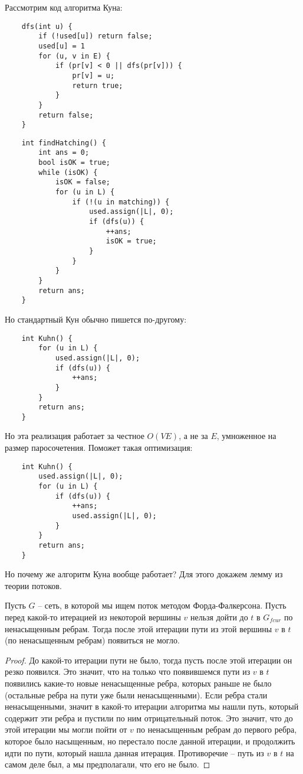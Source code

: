 \noindent Рассмотрим код алгоритма Куна:
\begin{lstlisting}
    dfs(int u) {
        if (!used[u]) return false;
        used[u] = 1
        for (u, v in E) {
            if (pr[v] < 0 || dfs(pr[v])) {
                pr[v] = u;
                return true;
            }
        }
        return false;
    }
\end{lstlisting}

\begin{lstlisting}
    int findHatching() {
        int ans = 0;
        bool isOK = true;
        while (isOK) {
            isOK = false;
            for (u in L) {
                if (!(u in matching)) {
                    used.assign(|L|, 0);
                    if (dfs(u)) {
                        ++ans;
                        isOK = true;
                    }
                }
            }
        }
        return ans;
    }
\end{lstlisting}

\noindent Но стандартный Кун обычно пишется по-другому:
\begin{lstlisting}
    int Kuhn() {
        for (u in L) {
            used.assign(|L|, 0);
            if (dfs(u)) {
                ++ans;
            }
        }
        return ans;
    }
\end{lstlisting}

\noindent Но эта реализация работает за честное $O(VE)$, а не за $E$, умноженное на размер паросочетения. Поможет такая оптимизация:
\begin{lstlisting}
    int Kuhn() {
        used.assign(|L|, 0);
        for (u in L) {
            if (dfs(u)) {
                ++ans;
                used.assign(|L|, 0);
            }
        }
        return ans;
    }
\end{lstlisting}

\noindent Но почему же алгоритм Куна вообще работает? Для этого докажем лемму из теории потоков.
\begin{lemma}
    Пусть $G$ -- сеть, в которой мы ищем поток методом Форда-Фалкерсона. Пусть перед какой-то итерацией из некоторой вершины $v$ нельзя дойти до $t$ в $G_{fcur}$ по ненасыщенным ребрам. Тогда после этой итерации пути из этой вершины $v$ в $t$ (по ненасыщенным ребрам) появиться не могло.
\end{lemma}

\begin{proof}
    До какой-то итерации пути не было, тогда пусть после этой итерации он резко появился. Это значит, что на только что появившемся пути из $v$ в $t$ появились какие-то новые ненасыщенные ребра, которых раньше не было (остальные ребра на пути уже были ненасыщенными). Если ребра стали ненасыщенными, значит в какой-то итерации алгоритма мы нашли путь, который содержит эти ребра и пустили по ним отрицательный поток. Это значит, что до этой итерации мы могли пойти от $v$ по ненасыщенным ребрам до первого ребра, которое было насыщенным, но перестало после данной итерации, и продолжить идти по пути, который нашла данная итерация. Противоречие -- путь из $v$ в $t$ на самом деле был, а мы предполагали, что его не было.
\end{proof}

